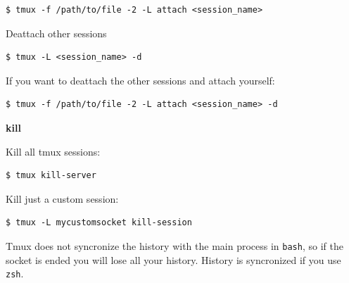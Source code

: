 \documentclass{article}
\newenvironment{blocktemplateIII}[1]{%
    \tcolorbox[beamer,%
    noparskip,breakable,
    ,colframe=Red,%
    colbacklower=LimeGreen!75!LightGreen,%
    title=#1]}%
    {\endtcolorbox}
\newenvironment{codetemplate}[1][]{%
  \mybasecolorbox[#1]
  \itshape
}{%
  \endmybasecolorbox
}
\begin{document}
\begin{codetemplate}
\begin{verbatim}
$ tmux -f /path/to/file -2 -L attach <session_name>
\end{verbatim}
\end{codetemplate}

Deattach other sessions
\begin{codetemplate}
\begin{verbatim}
$ tmux -L <session_name> -d
\end{verbatim}
\end{codetemplate}

If you want to deattach the other sessions and attach yourself:
\begin{codetemplate}
\begin{verbatim}
$ tmux -f /path/to/file -2 -L attach <session_name> -d
\end{verbatim}
\end{codetemplate}

\textbf{kill}

Kill all tmux sessions:
\begin{codetemplate}
\begin{verbatim}
$ tmux kill-server
\end{verbatim}
\end{codetemplate}

Kill just a custom session:
\begin{codetemplate}
\begin{verbatim}
$ tmux -L mycustomsocket kill-session
\end{verbatim}
\end{codetemplate}

\begin{blocktemplateIII}{Warning}
Tmux does not syncronize the history with the main process in \verb|bash|, so if the socket is ended you will lose all your history. History is syncronized if you use \verb|zsh|.
\end{blocktemplateIII}
\end{document}
